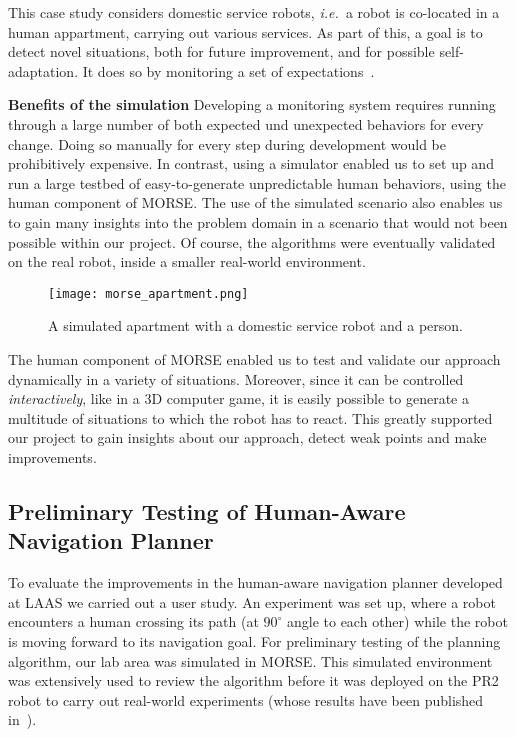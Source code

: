 \documentclass{llncs}
\newcommand{\ie}{{\textit{i.e.~}}}
\begin{document}
This case study considers domestic service robots, \ie a robot is
co-located in a human appartment, carrying out various services. As part of 
this, a goal is to detect novel situations, both for future improvement, and 
for possible self-adaptation. It does so by monitoring a set of
expectations~\cite{Karg2013}.
 
\textbf{Benefits of the simulation} Developing a monitoring system requires
running through a large number of both expected und unexpected behaviors for
every change. Doing so manually for every step during development would be 
prohibitively expensive. In contrast, using a simulator enabled us to
set up and run a large testbed of easy-to-generate unpredictable human behaviors,
using the human component of MORSE. The use of the simulated
scenario also enables us to gain many insights into the problem domain in a scenario
that would not been possible within our project. Of course, the algorithms were
eventually validated on the real robot, inside a smaller real-world environment.

\begin{figure}[t]
      \centering
      \texttt{[image: morse\_apartment.png]}
      \caption{A simulated apartment with a domestic service robot and a person.}
      \label{fig|apartment}
\end{figure}

The human component of MORSE enabled us to test and validate our approach
dynamically in a variety of situations. Moreover, since it can be controlled
\emph{interactively}, like in a 3D computer game, it is easily possible to generate 
a multitude of situations to which the robot has to react. This greatly supported 
our project to gain insights about our approach, detect weak points and make improvements.

\subsection{Preliminary Testing of Human-Aware Navigation Planner}
\label{sc:navigation}

To evaluate the improvements in the human-aware navigation planner developed at
LAAS we carried out a user study. An experiment was set up,
where a robot encounters a human crossing its path (at $90^{\circ }$ angle to
each other) while the robot is moving forward to its navigation goal. For
preliminary testing of the planning algorithm, our lab area was simulated in
MORSE. This simulated environment was extensively used
to review the algorithm before it was deployed on the PR2 robot to carry out
real-world experiments (whose results have been published
in~\cite{ThibaultKruse2014}).
\end{document}

